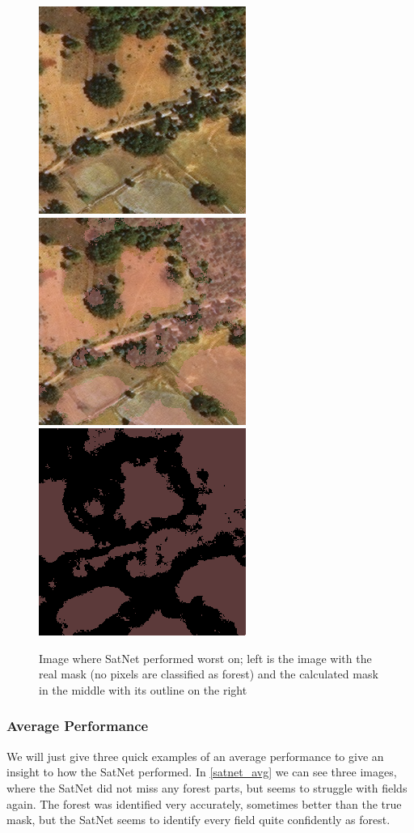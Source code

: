 \begin{figure}
\begin{center}
  \label{satnet_worst2}
  \includegraphics[width=.3\linewidth]{images/satellite_images/sat_worst2_1}
  \includegraphics[width=.3\linewidth]{images/satellite_images/sat_worst2_2}
  \includegraphics[width=.3\linewidth]{images/satellite_images/sat_worst2_3}
  \caption{Image where SatNet performed worst on; left is the image with the real mask (no pixels are classified as forest) and the calculated mask in the middle with its outline on the right}
  \end{center}
\end{figure}

\subsubsection{Average Performance}

We will just give three quick examples of an average performance to give an insight to how the SatNet performed. In \ref{satnet_avg} we can see three images, where the SatNet did not miss any forest parts, but seems to struggle with fields again. The forest was identified very accurately, sometimes better than the true mask, but the SatNet seems to identify every field quite confidently as forest.

